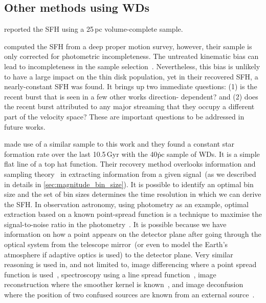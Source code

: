 \documentclass[fleqn,usenatbib]{mnras}
\begin{document}
\subsection{Other methods using WDs}
\citet{2014ApJ...791...92T} reported the SFH using a 25\,pc volume-complete
sample. 


\citet{2019ApJ...887..148F} computed the SFH from a deep proper motion survey,
however, their sample is only corrected for photometric incompleteness. The
untreated kinematic bias can lead to incompleteness in the sample
selection~\citep{2014ApJ...791...92T, 2015MNRAS.450.4098L}. Nevertheless, this
bias is unlikely to have a large impact on the thin disk population, yet in
their recovered SFH, a nearly-constant SFH was found. It brings up two immediate
questions: (1) is the recent burst that is seen in a few other works direction-
dependent? and (2) does the recent burst attributed to any major streaming that
they occupy a different part of the velocity space? These are important
questions to be addressed in future works.

\citet{2023MNRAS.522.1643C} made use of a similar sample to this work and they
found a constant star formation rate over the last 10.5\,Gyr with the 40\.pc
sample of WDs. It is a simple flat line of a top hat function. Their recovery
method overlooks information and sampling theory~\citep{1949IEEEP..37...10S}
in extracting information from a given signal~(as we described in details in
\ref{sec:magnitude_bin_size}). It is possible to identify an optimal bin size
and the set of bin sizes determines the time resolution in which we can derive
the SFH. In observation astronomy, using photometry as an example, optimal
extraction based on a known point-spread function is a technique to maximise
the signal-to-noise ratio in the photometry~\citep{1980SPIE..264..171T,
1987PASP...99..191S}. It is possible because we have information on how a point
appears on the detector plane after going through the optical system from the
telescope mirror~(or even to model the Earth's atmosphere if adaptive optics
is used) to the detector plane. Very similar reasoning is used in, and not
limited to, image differencing where a point spread function is
used~\citep{1998ApJ...503..325A, 2008MNRAS.386L..77B, 2009MNRAS.397.2099A,
2016ApJ...830...27Z}, spectroscopy using a line spread
function~\citep{1986PASP...98..609H, 1989PASP..101.1032M, 2003PASP..115..688K},
image reconstruction where the smoother kernel is
known~\citep{1972JOSA...62...55R, 1974AJ.....79..745L}, and image
deconfusion where the position of two confused sources are known from an
external source~\citep{2015A&A...582A..15M}.
\end{document}
